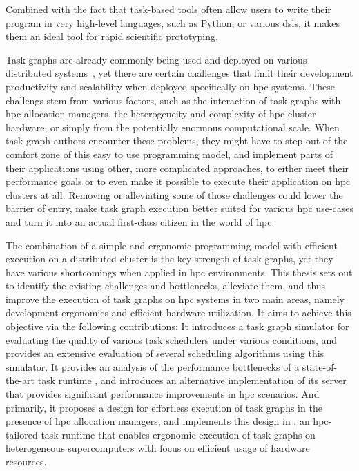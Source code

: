 Combined with the fact that task-based tools often allow users to write their program in very
high-level languages, such as Python, or various \glspl{dsl}, it makes them an ideal
tool for rapid scientific prototyping.

Task graphs are already commonly being used and deployed on various distributed
systems~\cite{pegasus, workflows_at_scale, large_scale_modelling}, yet there are certain challenges that limit their development
productivity and scalability when deployed specifically on \gls{hpc} systems. These
challengs stem from various factors, such as the interaction of task-graphs with
\gls{hpc} allocation managers, the heterogeneity and complexity of
\gls{hpc} cluster hardware, or simply from the potentially enormous computational
scale. When task graph authors encounter these problems, they might have to step out of the comfort
zone of this easy to use programming model, and implement parts of their applications using other,
more complicated approaches, to either meet their performance goals or to even make it possible to
execute their application on \gls{hpc} clusters at all. Removing or alleviating some
of those challenges could lower the barrier of entry, make task graph execution better suited for
various \gls{hpc} use-cases and turn it into an actual first-class citizen in the
world of \gls{hpc}\@.

The combination of a simple and ergonomic programming model with efficient execution on a
distributed cluster is the key strength of task graphs, yet they have various shortcomings when
applied in \gls{hpc} environments. This thesis sets out to identify the existing
challenges and bottlenecks, alleviate them, and thus improve the execution of task graphs on
\gls{hpc} systems in two main areas, namely development ergonomics and efficient
hardware utilization. It aims to achieve this objective via the following contributions: It
introduces a task graph simulator for evaluating the quality of various task schedulers under
various conditions, and provides an extensive evaluation of several scheduling algorithms using
this simulator. It provides an analysis of the performance bottlenecks of a state-of-the-art task
runtime \dask{}, and introduces an alternative implementation of its server that
provides significant performance improvements in \gls{hpc} scenarios. And primarily,
it proposes a design for effortless execution of task graphs in the presence of
\gls{hpc} allocation managers, and implements this design in \hyperqueue{},
an \gls{hpc}-tailored task runtime that enables ergonomic execution of task graphs on
heterogeneous supercomputers with focus on efficient usage of hardware resources.

